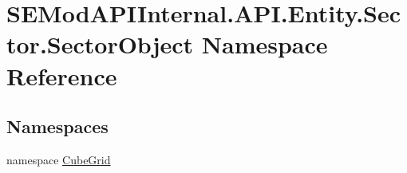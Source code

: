 \hypertarget{namespace_s_e_mod_a_p_i_internal_1_1_a_p_i_1_1_entity_1_1_sector_1_1_sector_object}{}\section{S\+E\+Mod\+A\+P\+I\+Internal.\+A\+P\+I.\+Entity.\+Sector.\+Sector\+Object Namespace Reference}
\label{namespace_s_e_mod_a_p_i_internal_1_1_a_p_i_1_1_entity_1_1_sector_1_1_sector_object}
\subsection*{Namespaces}
\begin{DoxyCompactItemize}
\item 
namespace \hyperlink{namespace_s_e_mod_a_p_i_internal_1_1_a_p_i_1_1_entity_1_1_sector_1_1_sector_object_1_1_cube_grid}{Cube\+Grid}
\end{DoxyCompactItemize}
